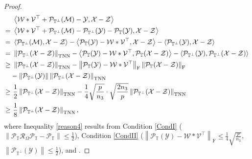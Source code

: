 \documentclass[twoside,12pt]{article}
\newcommand{\TNN}{\textnormal{TNN}}
\def\fro{{\mathrm{F}}}
\def\fro{{\mathrm{F}}}
\begin{document}
\begin{proof}
\begin{align}
   & ~\left\langle \mathcal{W}*\mathcal{V}^{\top}+\mathcal{P}_{\mathbb{T}^{\perp}}(\mathcal{M})-\mathcal{Y},\mathcal{X}-\mathcal{Z}\right\rangle \notag\\
   =& ~ \left\langle \mathcal{W}*\mathcal{V}^{\top}+\mathcal{P}_{\mathbb{T}^{\perp}}(\mathcal{M})-\mathcal{P}_{\mathbb{T}^{\perp}}(\mathcal{Y})-\mathcal{P}_{\mathbb{T}}(\mathcal{Y}),\mathcal{X}-\mathcal{Z}\right\rangle \notag \\
   =& ~ \left\langle \mathcal{P}_{\mathbb{T}^{\perp}}(\mathcal{M}),\mathcal{X}-\mathcal{Z}\right\rangle - \left\langle \mathcal{P}_{\mathbb{T}}(\mathcal{Y})-\mathcal{W}*\mathcal{V}^{\top},\mathcal{X}-\mathcal{Z}\right\rangle- \left\langle \mathcal{P}_{\mathbb{T}^{\perp}}(\mathcal{Y}),\mathcal{X}-\mathcal{Z}\right\rangle \notag\\
    =& ~\left\|\mathcal{P}_{\mathbb{T}^{\perp}}(\mathcal{X}-\mathcal{Z})\right\|_{\TNN} - \left\langle \mathcal{P}_{\mathbb{T}}(\mathcal{Y})-\mathcal{W}*\mathcal{V}^{\top},\mathcal{P}_{\mathbb{T}}(\mathcal{X}-\mathcal{Z})\right\rangle- \left\langle \mathcal{P}_{\mathbb{T}^{\perp}}(\mathcal{Y}),\mathcal{P}_{\mathbb{T}^{\perp}}(\mathcal{X}-\mathcal{Z})\right\rangle \notag\\
    \geq &~\left\|\mathcal{P}_{\mathbb{T}^{\perp}}(\mathcal{X}-\mathcal{Z})\right\|_{\TNN}- \left\| \mathcal{P}_{\mathbb{T}}(\mathcal{Y})-\mathcal{W}*\mathcal{V}^{\top}\right\|_{\fro}\left\|\mathcal{P}_{\mathbb{T}}(\mathcal{X}-\mathcal{Z})\right\|_{\fro} \notag\\&- \left\|\mathcal{P}_{\mathbb{T}^{\perp}}(\mathcal{Y})\right\|\left\|\mathcal{P}_{\mathbb{T}^{\perp}}(\mathcal{X}-\mathcal{Z})\right\|_{\TNN} \notag\\
     \geq&~ \frac{1}{2}\left\|\mathcal{P}_{\mathbb{T}^{\perp}}(\mathcal{X}-\mathcal{Z})\right\|_{\TNN} - \frac{1}{4}\sqrt{\frac{p}{n_3}}\cdot\sqrt{\frac{2n_{3}}{p}}\left\|\mathcal{P}_{\mathbb{T}^{\perp}}(\mathcal{X}-\mathcal{Z})\right\|_{\TNN}\label{reason4} \\
    \geq&~\frac{1}{8}\left\|\mathcal{P}_{\mathbb{T}^{\perp}}(\mathcal{X}-\mathcal{Z})\right\|_{\TNN} \notag,
\end{align}
 where Inequality \eqref{reason4} results from Condition \ref{CondI} ($\left\|\mathcal{P}_{\mathbb{T}}\mathcal{R}_{\Omega}\mathcal{P}_{\mathbb{T}}-\mathcal{P}_{\mathbb{T}}\right\| \leq \frac{1}{2}$), Condition \ref{CondII} ($\left\|\mathcal{P}_{\mathbb{T}}(\mathcal{Y})-\mathcal{W}*\mathcal{V}^{\top}\right\|_{\fro} \leq \frac{1}{4}\sqrt{\frac{p}{n_3}}$, 
$\left\|\mathcal{P}_{\mathbb{T}^{\perp}}(\mathcal{Y})\right\|\leq \frac{1}{2}$),  and .


\end{proof}
\end{document}
